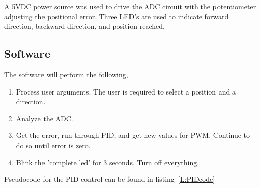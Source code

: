 \documentclass[10pt,conference]{IEEEtran}
\begin{document}
A 5VDC power source was used to drive the ADC circuit with the potentiometer adjusting the positional error. Three LED's are used to indicate forward direction, backward direction, and position reached.

\subsection{Software}
The software will perform the following,
\begin{enumerate}
	\item Process user arguments. The user is required to select a position and a direction.
	\item Analyze the ADC.
	\item Get the error, run through PID, and get new values for PWM. Continue to do so until error is zero.
	\item Blink the 'complete led' for 3 seconds. Turn off everything.
\end{enumerate}
Pseudocode for the PID control can be found in listing~\ref{L:PIDcode}
\end{document}
